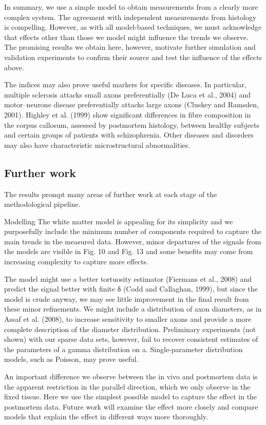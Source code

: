 In summary, we use a simple model to obtain measurements from a clearly more complex system. The agreement with independent measurements from histology is compelling. However, as with all model-based techniques, we must acknowledge that effects other than those we model might influence the trends we observe. The promising results we obtain here, however, motivate further simulation and validation experiments to confirm their source and test the influence of the effects above.

The indices may also prove useful markers for specific diseases. In particular, multiple sclerosis attacks small axons preferentially (De Luca et al., 2004) and motor–neurone disease preferentially attacks large axons (Cluskey and Ramsden, 2001). Highley et al. (1999) show significant differences in fibre composition in the corpus callosum, assessed by postmortem histology, between healthy subjects and certain groups of patients with schizophrenia. Other diseases and disorders may also have characteristic microstructural abnormalities.

\subsection*{Further work}
The results prompt many areas of further work at each stage of the methodological pipeline.

Modelling
The white matter model is appealing for its simplicity and we purposefully include the minimum number of components required to capture the main trends in the measured data. However, minor departures of the signals from the models are visible in Fig. 10 and Fig. 13 and some benefits may come from increasing complexity to capture more effects.

The model might use a better tortuosity estimator (Fiermans et al., 2008) and predict the signal better with finite δ (Codd and Callaghan, 1999), but since the model is crude anyway, we may see little improvement in the final result from these minor refinements. We might include a distribution of axon diameters, as in Assaf et al. (2008), to increase sensitivity to smaller axons and provide a more complete description of the diameter distribution. Preliminary experiments (not shown) with our sparse data sets, however, fail to recover consistent estimates of the parameters of a gamma distribution on a. Single-parameter distribution models, such as Poisson, may prove useful.

An important difference we observe between the in vivo and postmortem data is the apparent restriction in the parallel direction, which we only observe in the fixed tissue. Here we use the simplest possible model to capture the effect in the postmortem data. Future work will examine the effect more closely and compare models that explain the effect in different ways more thoroughly.

